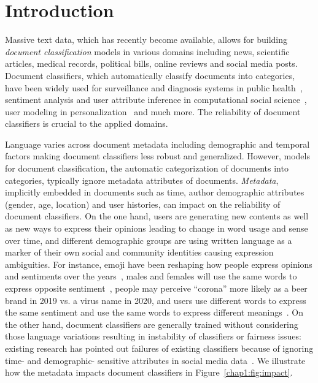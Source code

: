 \chapter{Introduction}
\label{chp:intro}

Massive text data, which has recently become available, allows for building \textit{document classification} models in various domains including news, scientific articles, medical records, political bills, online reviews and social media posts.
Document classifiers, which automatically classify documents into categories, have been widely used for surveillance and diagnosis systems in public health~\cite{lamb2013separating, de2016discovering, huang2019can, zhu2019detecting}, sentiment analysis and user attribute inference in computational social science~\cite{rosenthal2011age, yang2016hierarchical, huang2017exploring, heindorf2019debiasing}, user modeling in personalization~\cite{tang2015learning, wu2016personalized, huang2019neuraluser, pan2019social} and much more. 
The reliability of document classifiers is crucial to the applied domains.


Language varies across document metadata including demographic and temporal factors making document classifiers less robust and generalized. 
However, models for document classification, the automatic categorization of documents into categories, typically ignore metadata attributes of documents. 
\textit{Metadata}, implicitly embedded in documents such as time, author demographic attributes (gender, age, location) and user histories, can impact on the reliability of document classifiers.
On the one hand, users are generating new contents as well as new ways to express their opinions leading to change in word usage and sense over time, and different demographic groups are using written language as a marker of their own social and community identities causing expression ambiguities.
For instance, emoji have been reshaping how people express opinions and sentiments over the years~\cite{felbo2017using}, males and females will use the same words to express opposite sentiment~\cite{volkova2013exploring}, people may perceive ``corona'' more likely as a beer brand in 2019 vs. a virus name in 2020, and users use different words to express the same sentiment and use the same words to express different meanings~\cite{oba2019modeling}. %
On the other hand, document classifiers are generally trained without considering those language variations resulting in instability of classifiers or fairness issues: existing research has pointed out failures of existing classifiers because of ignoring time- and demographic- sensitive attributes in social media data~\cite{gayo2011limits, gayo2013predicting}.
We illustrate how the metadata impacts document classifiers in Figure~\ref{chap1:fig:impact}.


